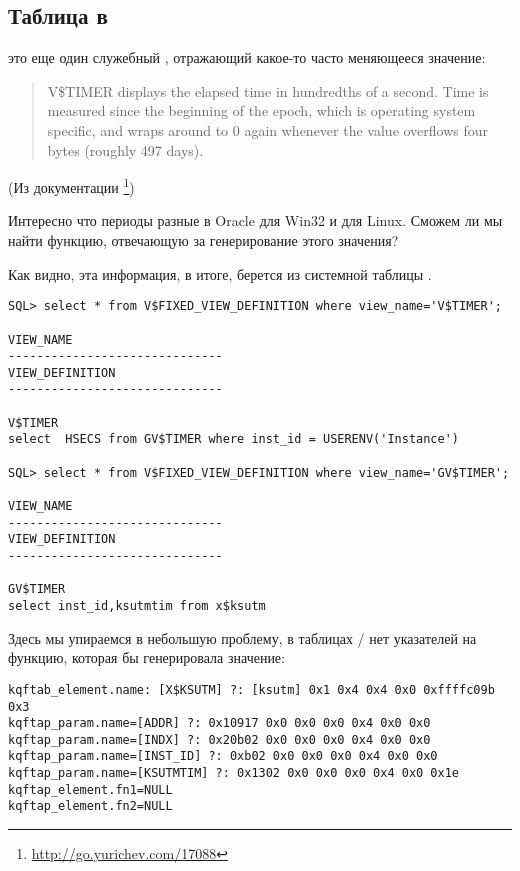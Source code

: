 \subsection{Таблица  в \oracle}
\myindex{\oracle}

 это еще один служебный , отражающий какое-то часто меняющееся значение:

\begin{framed}
\begin{quotation}
V\$TIMER displays the elapsed time in hundredths of a second. Time is measured since the beginning of the epoch, 
which is operating system specific, and wraps around to 0 again whenever the value overflows four bytes 
(roughly 497 days).
\end{quotation}
\end{framed}(Из документации \oracle
\footnote{\url{http://go.yurichev.com/17088}})

Интересно что периоды разные в Oracle для Win32 и для Linux. Сможем ли мы найти функцию, отвечающую 
за генерирование этого значения?

Как видно, эта информация, в итоге, берется из системной таблицы .

\begin{lstlisting}
SQL> select * from V$FIXED_VIEW_DEFINITION where view_name='V$TIMER';

VIEW_NAME
------------------------------
VIEW_DEFINITION
------------------------------

V$TIMER
select  HSECS from GV$TIMER where inst_id = USERENV('Instance')

SQL> select * from V$FIXED_VIEW_DEFINITION where view_name='GV$TIMER';

VIEW_NAME
------------------------------
VIEW_DEFINITION
------------------------------

GV$TIMER
select inst_id,ksutmtim from x$ksutm
\end{lstlisting}

Здесь мы упираемся в небольшую проблему, в таблицах / нет указателей на функцию, 
которая бы генерировала значение:

\begin{lstlisting}[caption=Результат работы \OracleTablesName]
kqftab_element.name: [X$KSUTM] ?: [ksutm] 0x1 0x4 0x4 0x0 0xffffc09b 0x3
kqftap_param.name=[ADDR] ?: 0x10917 0x0 0x0 0x0 0x4 0x0 0x0
kqftap_param.name=[INDX] ?: 0x20b02 0x0 0x0 0x0 0x4 0x0 0x0
kqftap_param.name=[INST_ID] ?: 0xb02 0x0 0x0 0x0 0x4 0x0 0x0
kqftap_param.name=[KSUTMTIM] ?: 0x1302 0x0 0x0 0x0 0x4 0x0 0x1e
kqftap_element.fn1=NULL
kqftap_element.fn2=NULL
\end{lstlisting}

